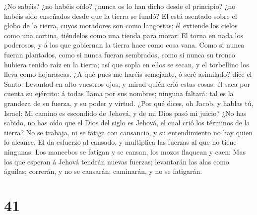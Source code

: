 ¿No sabéis? ¿no habéis oído? ¿nunca os lo han dicho desde el principio?
¿no habéis sido enseñados desde que la tierra se fundó? 
El está asentado sobre el globo de la tierra, cuyos moradores son como
langostas: él extiende los cielos como una cortina, tiéndelos como una
tienda para morar:  El torna en nada los poderosos, y á
los que gobiernan la tierra hace como cosa vana.  Como si
nunca fueran plantados, como si nunca fueran sembrados, como si nunca su
tronco hubiera tenido raíz en la tierra; así que sopla en ellos se
secan, y el torbellino los lleva como hojarascas.  ¿A qué
pues me haréis semejante, ó seré asimilado? dice el Santo.
 Levantad en alto vuestros ojos, y mirad quién crió estas
cosas: él saca por cuenta su ejército: á todas llama por sus nombres;
ninguna faltará: tal es la grandeza de su fuerza, y su poder y virtud.
 ¿Por qué dices, oh Jacob, y hablas tú, Israel: Mi camino
es escondido de Jehová, y de mi Dios pasó mi juicio?  ¿No
has sabido, no has oído que el Dios del siglo es Jehová, el cual crió
los términos de la tierra? No se trabaja, ni se fatiga con cansancio, y
su entendimiento no hay quien lo alcance.  El da esfuerzo
al cansado, y multiplica las fuerzas al que no tiene ningunas.
 Los mancebos se fatigan y se cansan, los mozos flaquean
y caen:  Mas los que esperan á Jehová tendrán nuevas
fuerzas; levantarán las alas como águilas; correrán, y no se cansarán;
caminarán, y no se fatigarán.

\hypertarget{section-40}{%
\section{41}\label{section-40}}

